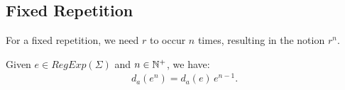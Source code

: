 \subsection{Fixed Repetition}
For a fixed repetition, we need $r$ to occur $n$ times, resulting in the notion $r^n$.
\begin{thm}
	\label{thm:fixed_repetition_derivative}
	Given $e \in RegExp(\Sigma)$ and $n \in {\mathbb{N}^{+}}$, we have:
	\begin{align*}
		d_a(e^n) = d_a(e)\,e^{n-1}.
	\end{align*}
\end{thm}

